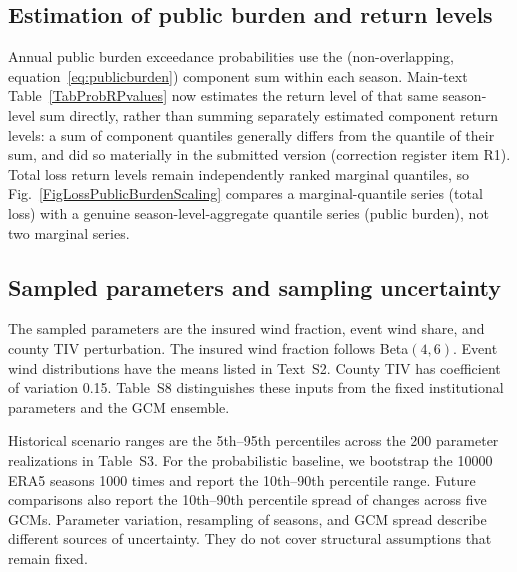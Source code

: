 \subsection*{Estimation of public burden and return levels}
Annual public burden exceedance probabilities use the (non-overlapping, equation~\eqref{eq:publicburden}) component sum within each season. Main-text Table~\ref{TabProbRPvalues} now estimates the return level of that same season-level sum directly, rather than summing separately estimated component return levels: a sum of component quantiles generally differs from the quantile of their sum, and did so materially in the submitted version (correction register item R1). Total loss return levels remain independently ranked marginal quantiles, so Fig.~\ref{FigLossPublicBurdenScaling} compares a marginal-quantile series (total loss) with a genuine season-level-aggregate quantile series (public burden), not two marginal series.

\subsection*{Sampled parameters and sampling uncertainty}
The sampled parameters are the insured wind fraction, event wind share, and county TIV perturbation. The insured wind fraction follows Beta$(4,6)$. Event wind distributions have the means listed in Text~S2. County TIV has coefficient of variation 0.15. Table~S8 distinguishes these inputs from the fixed institutional parameters and the GCM ensemble.

Historical scenario ranges are the 5th--95th percentiles across the 200 parameter realizations in Table~S3. For the probabilistic baseline, we bootstrap the \num{10000} ERA5 seasons \num{1000} times and report the 10th--90th percentile range. Future comparisons also report the 10th--90th percentile spread of changes across five GCMs. Parameter variation, resampling of seasons, and GCM spread describe different sources of uncertainty. They do not cover structural assumptions that remain fixed.

